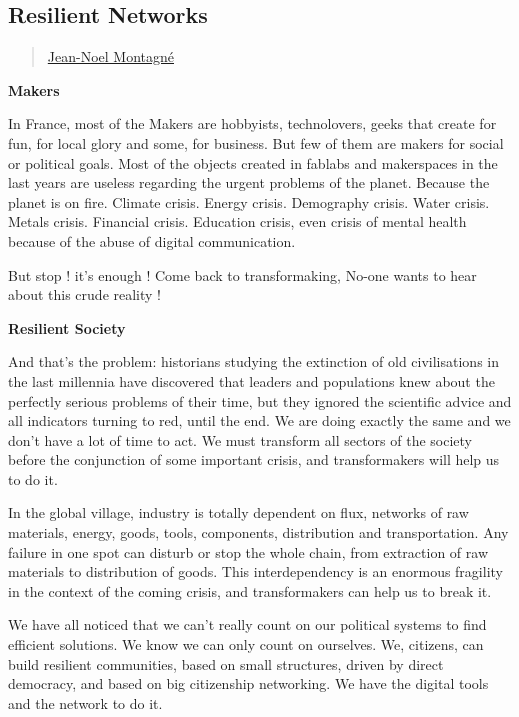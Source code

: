 \subsection{Resilient Networks}\label{resilient-networks}

\begin{quote}
\hyperlink{jean-noel-montagne}{Jean-Noel
Montagné}
\end{quote}

\textbf{Makers}

In France, most of the Makers are hobbyists, technolovers, geeks that
create for fun, for local glory and some, for business. But few of them
are makers for social or political goals. Most of the objects created in
fablabs and makerspaces in the last years are useless regarding the
urgent problems of the planet. Because the planet is on fire. Climate
crisis. Energy crisis. Demography crisis. Water crisis. Metals crisis.
Financial crisis. Education crisis, even crisis of mental health because
of the abuse of digital communication.

But stop ! it's enough ! Come back to transformaking, No-one wants to
hear about this crude reality !

\textbf{Resilient Society}

And that's the problem: historians studying the extinction of old
civilisations in the last millennia have discovered that leaders and
populations knew about the perfectly serious problems of their time, but
they ignored the scientific advice and all indicators turning to red,
until the end. We are doing exactly the same and we don't have a lot of
time to act. We must transform all sectors of the society before the
conjunction of some important crisis, and transformakers will help us to
do it.

In the global village, industry is totally dependent on flux, networks
of raw materials, energy, goods, tools, components, distribution and
transportation. Any failure in one spot can disturb or stop the whole
chain, from extraction of raw materials to distribution of goods. This
interdependency is an enormous fragility in the context of the coming
crisis, and transformakers can help us to break it.

We have all noticed that we can't really count on our political systems
to find efficient solutions. We know we can only count on ourselves. We,
citizens, can build resilient communities, based on small structures,
driven by direct democracy, and based on big citizenship networking. We
have the digital tools and the network to do it.


